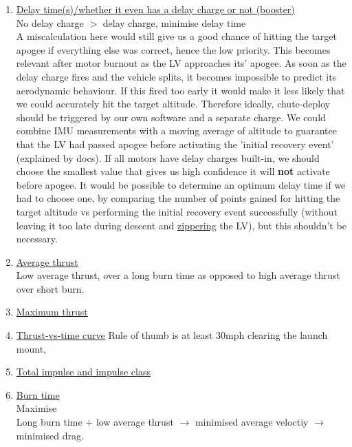 \documentclass[11pt,table]{article}
\begin{document}
\begin{enumerate}
    
    \item \underline{Delay time(s)/whether it even has a delay charge or not (booster)} \\
    No delay charge $>$ delay charge, minimise delay time \\
	A miscalculation here would still give us a good chance of hitting the target apogee if everything else was correct,
	hence the low priority. This becomes relevant after motor burnout as the LV approaches its' apogee. As soon as the
	delay charge fires and the vehicle splits, it becomes impossible to predict its aerodynamic behaviour. If this fired
	too early it would make it less likely that we could accurately hit the target altitude. Therefore ideally,
	chute-deploy should be triggered by our own software and a separate charge. We could combine IMU measurements with a
	moving average of altitude to guarantee that the LV had passed apogee before activating the 'initial recovery event'
	(explained by docs). If all motors have delay charges built-in, we should choose the smallest value that gives us
	high confidence it will \textbf{not} activate before apogee. It would be possible to determine an optimum delay time
	if we had to choose one, by comparing the number of points gained for hitting the target altitude vs performing the
	initial recovery event successfully (without leaving it too late during descent and
	\href{https://www.rocketreviews.com/zipper--zippering-180703140820.html}{zippering} the LV), but this shouldn't be
	necessary.
    
    \item \underline{Average thrust} \\
	Low average thrust, over a long burn time as opposed to high average thrust over short burn.

    \item \underline{Maximum thrust}
    
    \item \underline{Thrust-vs-time curve}
	Rule of thumb is at least 30mph clearing the launch mount,
    
    \item \underline{Total impulse and impulse class}
    
    \item \underline{Burn time} \\
    Maximise \\
	Long burn time + low average thrust $\rightarrow$ minimised average veloctiy $\rightarrow$ minimised drag.
    

\end{enumerate}
\end{document}
